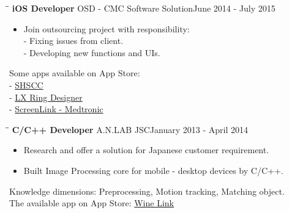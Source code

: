\documentclass[margin, 10pt]{res}
\begin{document}
\begin{resume}
   \begin{tabbing}
   \hspace{2.0in}\= \hspace{2.0in}\= \kill %
   {\bf iOS Developer} \>OSD - CMC  Software Solution\>June 2014 - July 2015\\
   \end{tabbing}\vspace{-20pt} %

   \begin{itemize}
   		\item Join outsourcing project with responsibility: \\ - Fixing issues from client. \\ - Developing new functions and UIs. 
		
   \end{itemize}
   Some apps available on App Store:   
   \\ - {\color{blue}\href{https://itunes.apple.com/sg/app/shscc/id984461329?mt=8}{SHSCC}}
   \\ - {\color{blue}\href{https://itunes.apple.com/us/app/lx-ring-designer/id878072384?mt=8}{LX Ring Designer}}				
   \\ - {\color{blue}\href{https://itunes.apple.com/ca/app/screenlink-medtronic/id602846516?mt=8}{ScreenLink - Medtronic}}
   
   \begin{tabbing}
   \hspace{2.0in}\= \hspace{2.0in}\= \kill %
   {\bf C/C++ Developer} \>A.N.LAB JSC\>January 2013 - April 2014\\
   \end{tabbing}\vspace{-20pt} %

   \begin{itemize}
   		\item Research and offer a solution for Japanese customer requirement. 
		\item Built Image Processing core for mobile - desktop devices by C/C++.		
		
   \end{itemize}
   Knowledge dimensions: Preprocessing, Motion tracking, Matching object.   
   \\ The available app on App Store: {\color{blue}\href{https://itunes.apple.com/jp/app/wine-link/id395904799?mt=8}{Wine Link}}
	

\end{resume}
\end{document}
